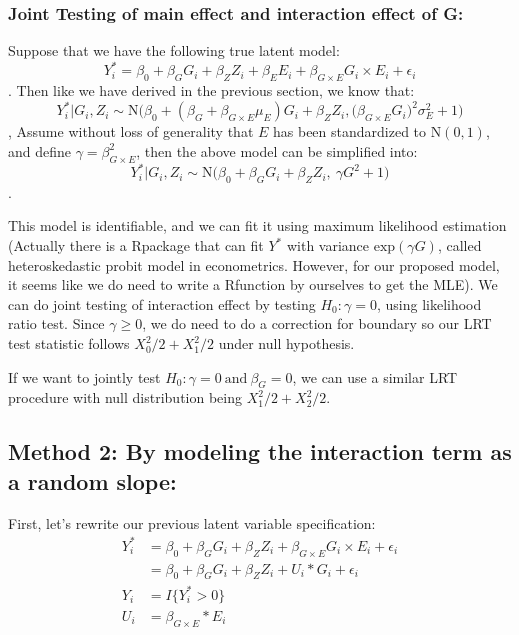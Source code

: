 \documentclass[]{article}
\begin{document}
\hypertarget{joint-testing-of-main-effect-and-interaction-effect-of-g}{%
\subsubsection{Joint Testing of main effect and interaction effect of
G:}\label{joint-testing-of-main-effect-and-interaction-effect-of-g}}

Suppose that we have the following true latent model:
\[ Y_i ^{*} = \beta_0 + \beta_G G_i + \beta_Z Z_i + \beta_E E_i + \beta_{G\times E}G_i \times E_i + \epsilon_i \].
Then like we have derived in the previous section, we know that:
\[Y_i^*|G_i, Z_i \sim \text{N}\bigg(\beta_0 + (\beta_G + \beta_{G\times E} \mu_E)G_i + \beta_Z Z_i,  \big(\beta_{G\times E} G_i\big)^2 \sigma_E^2 + 1\bigg)\],
Assume without loss of generality that \(E\) has been standardized to
\(\text{N}(0,1)\), and define \(\gamma = \beta_{G\times E}^2\), then the
above model can be simplified into:
\[Y_i^*|G_i, Z_i \sim \text{N}\bigg(\beta_0 + \beta_GG_i + \beta_ZZ_i,\ \gamma G^2 + 1\bigg)\].

This model is identifiable, and we can fit it using maximum likelihood
estimation (Actually there is a Rpackage that can fit \(Y^*\) with
variance \(\text{exp}(\gamma G)\), called heteroskedastic probit model
in econometrics. However, for our proposed model, it seems like we do
need to write a Rfunction by ourselves to get the MLE). We can do joint
testing of interaction effect by testing \(H_0: \gamma = 0\), using
likelihood ratio test. Since \(\gamma \geq 0\), we do need to do a
correction for boundary so our LRT test statistic follows
\(X^2_{0}/2 +X^2_{1}/2\) under null hypothesis.

If we want to jointly test
\(H_0: \gamma = 0 \ \text{and} \ \beta_G =0\), we can use a similar LRT
procedure with null distribution being \(X^2_{1}/2 +X^2_{2}/2\).

\hypertarget{method-2-by-modeling-the-interaction-term-as-a-random-slope}{%
\subsection{Method 2: By modeling the interaction term as a random
slope:}\label{method-2-by-modeling-the-interaction-term-as-a-random-slope}}

First, let's rewrite our previous latent variable specification:
\begin{equation}\label{eqn:latentformulationRandomSlope}
\begin{aligned}
Y_i^* &= \beta_0 + \beta_G G_i + \beta_Z Z_i + \beta_{G\times E} G_i \times E_i + \epsilon_i \\
      &= \beta_0 + \beta_G G_i + \beta_Z Z_i + U_i * G_i + \epsilon_i \\
Y_i &= I\{Y_i^*>0\} \\
U_i &= \beta_{G\times E} * E_i
\end{aligned}
\end{equation}
\end{document}
